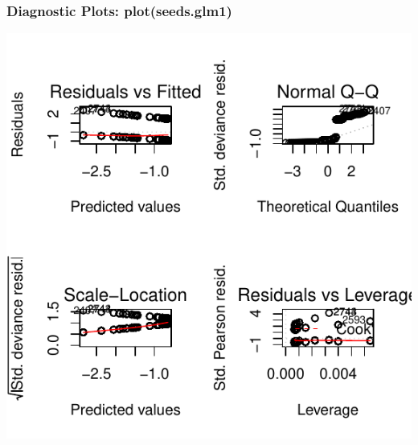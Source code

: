 \documentclass[handout]{beamer}\usepackage[]{graphicx}\usepackage[]{color}
\makeatletter
\def\maxwidth{ %
  \ifdim\Gin@nat@width>\linewidth
    \linewidth
  \else
    \Gin@nat@width
  \fi
}
\newenvironment{knitrout}{}{} %
\makeatother
\begin{document}
\begin{frame}[fragile]\frametitle{Diagnostic Plots: { plot(seeds.glm1)}}
\begin{knitrout}
\color{fgcolor}
\includegraphics[width=\maxwidth]{figure/unnamed-chunk-7-1} 

\end{knitrout}


\end{frame}
\end{document}
